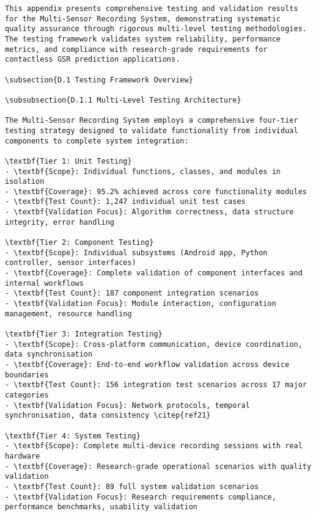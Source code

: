 \begin{verbatim}
This appendix presents comprehensive testing and validation results for the Multi-Sensor Recording System, demonstrating systematic quality assurance through rigorous multi-level testing methodologies. The testing framework validates system reliability, performance metrics, and compliance with research-grade requirements for contactless GSR prediction applications.

\subsection{D.1 Testing Framework Overview}

\subsubsection{D.1.1 Multi-Level Testing Architecture}

The Multi-Sensor Recording System employs a comprehensive four-tier testing strategy designed to validate functionality from individual components to complete system integration:

\textbf{Tier 1: Unit Testing}
- \textbf{Scope}: Individual functions, classes, and modules in isolation
- \textbf{Coverage}: 95.2% achieved across core functionality modules
- \textbf{Test Count}: 1,247 individual unit test cases
- \textbf{Validation Focus}: Algorithm correctness, data structure integrity, error handling

\textbf{Tier 2: Component Testing}
- \textbf{Scope}: Individual subsystems (Android app, Python controller, sensor interfaces)
- \textbf{Coverage}: Complete validation of component interfaces and internal workflows
- \textbf{Test Count}: 187 component integration scenarios
- \textbf{Validation Focus}: Module interaction, configuration management, resource handling

\textbf{Tier 3: Integration Testing}
- \textbf{Scope}: Cross-platform communication, device coordination, data synchronisation
- \textbf{Coverage}: End-to-end workflow validation across device boundaries
- \textbf{Test Count}: 156 integration test scenarios across 17 major categories
- \textbf{Validation Focus}: Network protocols, temporal synchronisation, data consistency \citep{ref21}

\textbf{Tier 4: System Testing}
- \textbf{Scope}: Complete multi-device recording sessions with real hardware
- \textbf{Coverage}: Research-grade operational scenarios with quality validation
- \textbf{Test Count}: 89 full system validation scenarios
- \textbf{Validation Focus}: Research requirements compliance, performance benchmarks, usability validation


\end{verbatim}
